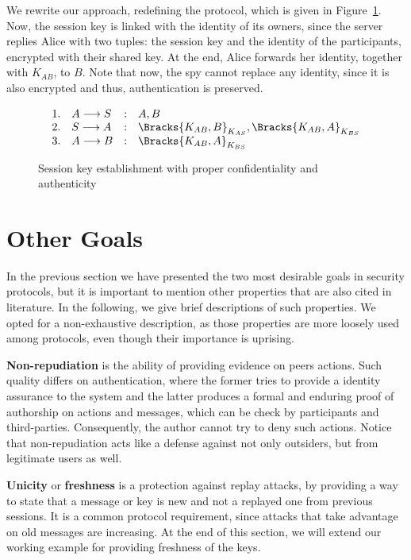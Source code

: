 We rewrite our approach, redefining the protocol, which is given in Figure~\ref{prt:session-key-auth}. Now, the session key is linked with the identity of its owners, since the server replies Alice with two tuples: the session key and the identity of the participants, encrypted with their shared key. At the end, Alice forwards her identity, together with \(K_{AB}\), to \(B\). Note that now, the spy cannot replace any identity, since it is also encrypted and thus, authentication is preserved.

\begin{figure}[ht]\label{prt:session-key-auth}
  \centering
  \[
    \begin{array}{rlcl}
      1. & A \longrightarrow S &:& A, B \\
      2. & S \longrightarrow A &:& \Bracks{K_{AB}, B}_{K_{AS}}, \Bracks{K_{AB}, A}_{K_{BS}} \\
      3. & A \longrightarrow B &:& \Bracks{K_{AB}, A}_{K_{BS}} \\
    \end{array}
  \]
  \caption{Session key establishment with proper confidentiality and authenticity}
\end{figure}





\section{Other Goals}
In the previous section we have presented the two most desirable goals in security protocols, but it is important to mention other properties that are also cited in literature. In the following, we give brief descriptions of such properties. We opted for a non-exhaustive description, as those properties are more loosely used among protocols, even though their importance is uprising.

\textbf{Non-repudiation} is the ability of providing evidence on peers actions. Such quality differs on authentication, where the former tries to provide a identity assurance to the system and the latter produces a formal and enduring proof of authorship on actions and messages, which can be check by participants and third-parties. Consequently, the author cannot try to deny such actions. Notice that non-repudiation acts like a defense against not only outsiders, but from legitimate users as well.

\textbf{Unicity} or \textbf{freshness} is a protection against replay attacks, by providing a way to state that a message or key is new and not a replayed one from previous sessions. It is a common protocol requirement, since attacks that take advantage on old messages are increasing. At the end of this section, we will extend our working example for providing freshness of the keys.

